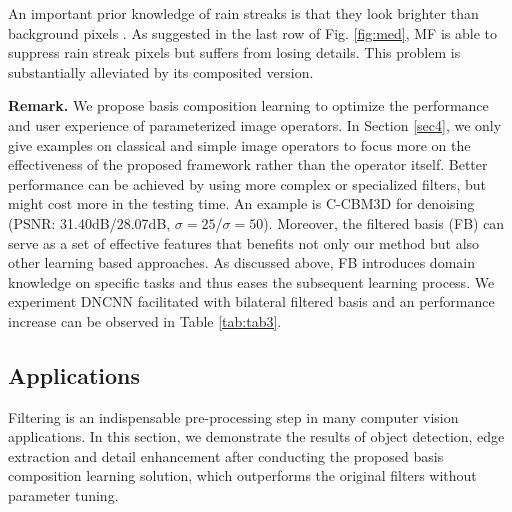 \documentclass[twocolumn]{svjour3}          %
\begin{document}
An important prior knowledge of rain streaks is that they look brighter than background pixels \cite{garg2007vision}. As suggested in the last row of Fig. \ref{fig:med}, MF is able to suppress rain streak pixels but suffers from losing details. This problem is substantially alleviated by its composited version.

\textbf{Remark.} We propose basis composition learning to optimize the performance and user experience of parameterized image operators. In Section \ref{sec4}, we only give examples on classical and simple image operators to focus more on the effectiveness of the proposed framework rather than the operator itself. Better performance can be achieved by using more complex or specialized filters, but might cost more in the testing time. An example is C-CBM3D for denoising (PSNR: 31.40dB/28.07dB, $\sigma=25$/$\sigma=50$). Moreover, the filtered basis (FB) can serve as a set of effective features that benefits not only our method but also other learning based approaches. As discussed above, FB introduces domain knowledge on specific tasks and thus eases the subsequent learning process. We experiment DNCNN facilitated with bilateral filtered basis and an performance increase can be observed in Table \ref{tab:tab3}.

 \begin{figure}[]
	\end{figure}

 \subsection{Applications}
 Filtering is an indispensable pre-processing step in many computer vision applications. In this section, we demonstrate the results of object detection, edge extraction and detail enhancement after conducting the proposed basis composition learning solution, which outperforms the original filters without parameter tuning.
\end{document}
